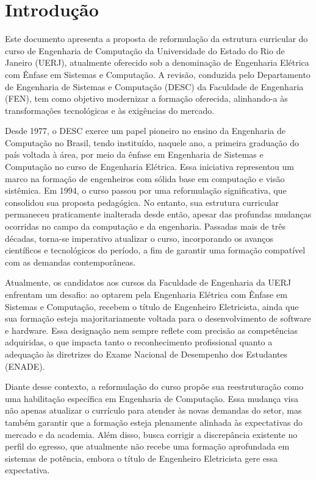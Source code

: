\chapter{Introdução}
\label{intro} %

Este documento apresenta a proposta de reformulação da estrutura curricular do curso de Engenharia de Computação da Universidade do Estado do Rio de Janeiro (UERJ), atualmente oferecido sob a denominação de Engenharia Elétrica com Ênfase em Sistemas e Computação. A revisão, conduzida pelo Departamento de Engenharia de Sistemas e Computação (DESC) da Faculdade de Engenharia (FEN), tem como objetivo modernizar a formação oferecida, alinhando-a às transformações tecnológicas e às exigências do mercado.

Desde 1977, o DESC exerce um papel pioneiro no ensino da Engenharia de Computação no Brasil, tendo instituído, naquele ano, a primeira graduação do país voltada à área, por meio da ênfase em Engenharia de Sistemas e Computação no curso de Engenharia Elétrica. Essa iniciativa representou um marco na formação de engenheiros com sólida base em computação e visão sistêmica. Em 1994, o curso passou por uma reformulação significativa, que consolidou sua proposta pedagógica. No entanto, sua estrutura curricular permaneceu praticamente inalterada desde então, apesar das profundas mudanças ocorridas no campo da computação e da engenharia. Passadas mais de três décadas, torna-se imperativo atualizar o curso, incorporando os avanços científicos e tecnológicos do período, a fim de garantir uma formação compatível com as demandas contemporâneas.

Atualmente, os candidatos aos cursos da Faculdade de Engenharia da UERJ enfrentam um desafio: ao optarem pela Engenharia Elétrica com Ênfase em Sistemas e Computação, recebem o título de Engenheiro Eletricista, ainda que sua formação esteja majoritariamente voltada para o desenvolvimento de software e hardware. Essa designação nem sempre reflete com precisão as competências adquiridas, o que impacta tanto o reconhecimento profissional quanto a adequação às diretrizes do Exame Nacional de Desempenho dos Estudantes (ENADE).

Diante desse contexto, a reformulação do curso propõe sua reestruturação como uma habilitação específica em Engenharia de Computação. Essa mudança visa não apenas atualizar o currículo para atender às novas demandas do setor, mas também garantir que a formação esteja plenamente alinhada às expectativas do mercado e da academia. Além disso, busca corrigir a discrepância existente no perfil do egresso, que atualmente não recebe uma formação aprofundada em sistemas de potência, embora o título de Engenheiro Eletricista gere essa expectativa.

